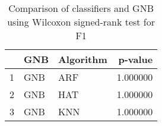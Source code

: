 \begin{table}
\footnotesize
\caption{Comparison of classifiers and GNB using Wilcoxon signed-rank test for F1}
\label{tab:GNB wilcoxon F1 comparison}
\begin{tabular}{lllr}
\hline
 & GNB & Algorithm & p-value \\
\hline
1 & GNB & ARF & 1.000000 \\
2 & GNB & HAT & 1.000000 \\
3 & GNB & KNN & 1.000000 \\
\hline
\end{tabular}
\end{table}
